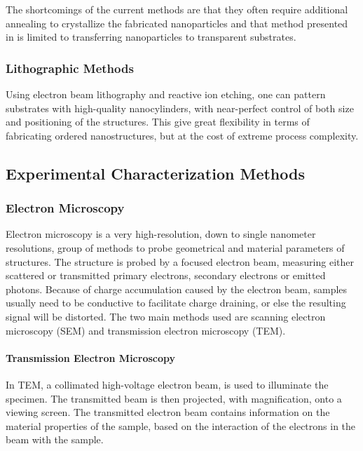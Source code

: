                 The shortcomings of the current methods are that they often require additional annealing to crystallize the fabricated nanoparticles and that
            method presented in \cite{zywietz2014laser} is limited to transferring nanoparticles to transparent substrates.

        \subsubsection{Lithographic Methods}
                Using electron beam lithography and reactive ion etching, one can pattern substrates with high-quality nanocylinders, with near-perfect
            control of both size and positioning of the structures\cite{bakker2015magnetic}. This give great flexibility in terms of fabricating ordered nanostructures, but at the
            cost of extreme process complexity.

    \subsection{Experimental Characterization Methods}
        \subsubsection{Electron Microscopy}
        \label{sec:ElectronMicroscopy}
                Electron microscopy is a very high-resolution, down to single nanometer resolutions, group of methods to probe geometrical and
            material parameters of structures. The structure is probed by a focused electron beam, measuring either scattered or transmitted
            primary electrons, secondary electrons or emitted photons. Because of charge accumulation caused by the electron beam, samples
            usually need to be conductive to facilitate charge draining, or else the resulting signal will be distorted.
                The two main methods used are scanning electron microscopy (SEM) and transmission electron microscopy (TEM).

            \paragraph{Transmission Electron Microscopy}
                    In TEM, a collimated high-voltage electron beam, is used to illuminate the specimen. The transmitted beam is then projected,
                with magnification, onto a viewing screen. The transmitted electron beam contains information on the material properties of the
                sample, based on the interaction of the electrons in the beam with the sample.

